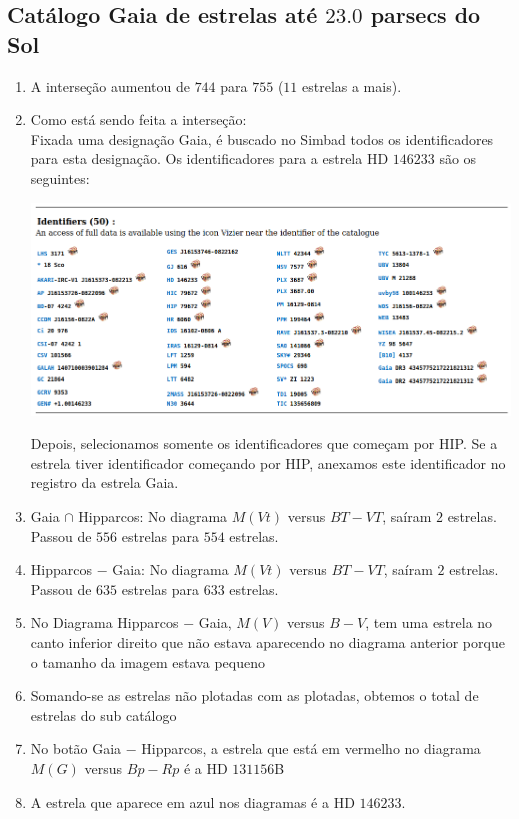 \documentclass{article}
\begin{document}
	\begin{center}
	\section*{\normalsize  Catálogo Gaia de estrelas até $23.0$ parsecs do Sol\\}
	\end{center}
	\vspace{50pt}

\begin{enumerate}
	\item A interseção aumentou de $744$ para $755$ ($11$ estrelas a mais).
	\item Como está sendo feita a interseção:\\
	Fixada uma designação Gaia, é buscado no Simbad todos os identificadores para esta designação. Os identificadores para a estrela HD $146233$ são os seguintes:
	
	\includegraphics[scale=0.35]{identifiers.png}
	
	Depois, selecionamos somente os identificadores que começam por HIP. 
	Se a estrela tiver identificador começando por HIP, anexamos este identificador no registro da estrela Gaia. 
	
	\item Gaia $\cap$ Hipparcos: No diagrama $M(Vt)$ versus $BT-VT$, saíram $2$ estrelas. Passou de $556$ estrelas para $554$ estrelas.
	
	\item Hipparcos $-$ Gaia: No diagrama $M(Vt)$ versus $BT-VT$, saíram $2$ estrelas. Passou de $635$ estrelas para $633$ estrelas. 
	
	\item No Diagrama Hipparcos $-$ Gaia,  $M(V)$  versus $B-V$, tem uma estrela no canto inferior direito que não estava aparecendo no diagrama anterior porque o tamanho da imagem estava pequeno
	
	\item Somando-se as estrelas não plotadas com as plotadas, obtemos o total de estrelas do sub catálogo
	
	\item No botão Gaia $-$ Hipparcos, a estrela que está em vermelho no diagrama $M(G)$ versus $Bp-Rp$ é a HD $131156$B
	
	\item A estrela que aparece em azul nos diagramas é a HD $146233$.
\end{enumerate}
\end{document}
